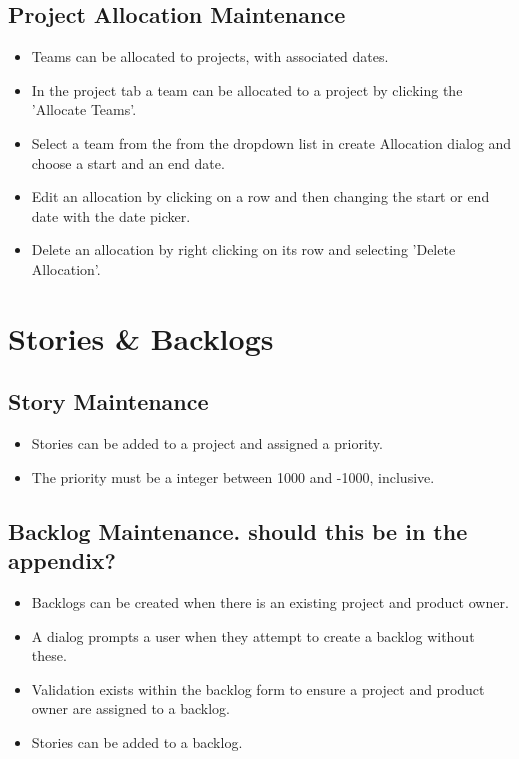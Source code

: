 \documentclass[11pt,fleqn]{book} %
\begin{document}
\subsection{Project Allocation Maintenance}
\begin{itemize}
  \item Teams can be allocated to projects, with associated dates.
  \item In the project tab a team can be allocated to a project by clicking the 'Allocate Teams'.
  \item Select a team from the from the dropdown list in create Allocation dialog and choose a start and an end date.
  \item Edit an allocation by clicking on a row and then changing the start or end date with the date picker.
  \item Delete an allocation by right clicking on its row and selecting 'Delete Allocation'.
\end{itemize}
\section{Stories \& Backlogs}

\subsection{Story Maintenance}
\begin{itemize}
  \item Stories can be added to a project and assigned a priority.
  \item The priority must be a integer between 1000 and -1000, inclusive.
\end{itemize}

\subsection{Backlog Maintenance. should this be in the appendix?}
\begin{itemize}
\item Backlogs can be created when there is an existing project and product owner.
\item A dialog prompts a user when they attempt to create a backlog without these.
\item Validation exists within the backlog form to ensure a project and product owner are assigned to a backlog.
\item Stories can be added to a backlog.
\end{itemize}
\end{document}
